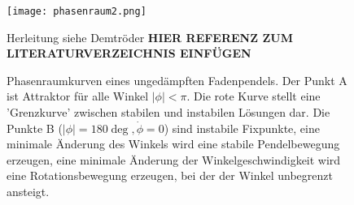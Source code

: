 \begin{figure}
\texttt{[image: phasenraum2.png]}
\caption{Phasenraumkurven eines ungedämpften Fadenpendels. Der Punkt A ist Attraktor für alle Winkel $|\phi|<\pi$. Die rote Kurve stellt eine 'Grenzkurve' zwischen stabilen und instabilen Lösungen dar. Die Punkte B ($|\phi|=180\deg, \dot{\phi}=0$) sind instabile Fixpunkte, eine minimale Änderung des Winkels wird eine stabile Pendelbewegung erzeugen, eine minimale Änderung der Winkelgeschwindigkeit wird eine Rotationsbewegung erzeugen, bei der der Winkel unbegrenzt ansteigt.}
Herleitung siehe Demtröder \textbf{HIER REFERENZ ZUM LITERATURVERZEICHNIS EINFÜGEN}
\end{figure}